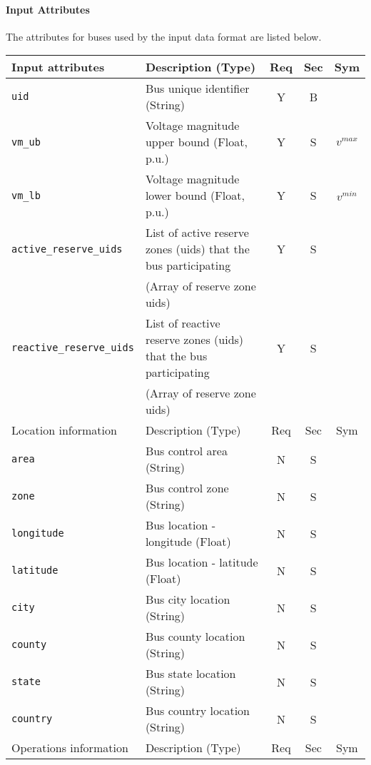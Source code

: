 \documentclass{article}
\begin{document}
\paragraph{Input Attributes} The attributes for buses used by the input data format are listed below.

\begin{center}
\small
\begin{tabular}{ l | l | c | c | c |}
Input attributes & Description (Type) & Req & Sec & Sym\\
\hline
  {\tt uid} & Bus unique identifier (String)& Y & B &  \\
  {\tt vm\_ub} & Voltage magnitude upper bound (Float, p.u.)& Y & S & $v^{max}$\\
  {\tt vm\_lb} & Voltage magnitude lower bound (Float, p.u.)& Y & S & $v^{min}$\\
  {\tt active\_reserve\_uids} & List of active reserve zones (uids) that the bus participating & Y & S & \\
                     &  (Array of reserve zone uids) &  & & \\
  {\tt reactive\_reserve\_uids} & List of reactive reserve zones (uids) that the bus participating & Y & S & \\
                     &  (Array of reserve zone uids) &  & & \\
  \hline
  Location information & Description (Type) & Req & Sec & Sym\\
  \hline
  {\tt area} &  Bus control area (String)& N & S & \\
  {\tt zone} &  Bus control zone (String)& N & S & \\
  {\tt longitude} & Bus location - longitude (Float) & N & S & \\
  {\tt latitude} & Bus location - latitude (Float) & N & S & \\
  {\tt city}     & Bus city location (String) & N & S & \\
  {\tt county}     & Bus county location (String) & N & S & \\
  {\tt state}    & Bus state location (String) & N & S & \\
  {\tt country}  & Bus country location (String) & N & S & \\
  \hline
    Operations information & Description (Type) & Req & Sec & Sym\\

\end{tabular}
\end{center}
\end{document}
